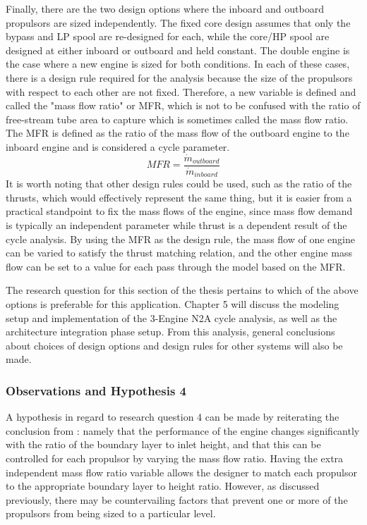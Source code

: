 			Finally, there are the two design options where the inboard and outboard propulsors are sized independently.  The fixed core design assumes that only the bypass and LP spool are re-designed for each, while the core/HP spool are designed at either inboard or outboard and held constant.  The double engine is the case where a new engine is sized for both conditions.  In each of these cases, there is a design rule required for the analysis because the size of the propulsors with respect to each other are not fixed.  Therefore, a new variable is defined and called the "mass flow ratio" or MFR, which is not to be confused with the ratio of free-stream tube area to capture which is sometimes called the mass flow ratio.  The MFR is defined as the ratio of the mass flow of the outboard engine to the inboard engine and is considered a cycle parameter.  
			\begin{equation}
				MFR = \frac{\dot{m}_{outboard}}{\dot{m}_{inboard}}
			\end{equation} 
			It is worth noting that other design rules could be used, such as the ratio of the thrusts, which would effectively represent the same thing, but it is easier from a practical standpoint to fix the mass flows of the engine, since mass flow demand is typically an independent parameter while thrust is a dependent result of the cycle analysis.  By using the MFR as the design rule, the mass flow of one engine can be varied to satisfy the thrust matching relation, and the other engine mass flow can be set to a value for each pass through the model based on the MFR.   			
			
			The research question for this section of the thesis pertains to which of the above options is preferable for this application.  Chapter 5 will discuss the modeling setup and implementation of the 3-Engine N2A cycle analysis, as well as the architecture integration phase setup.  From this analysis, general conclusions about choices of design options and design rules for other systems will also be made.  
									 			
  			\vspace{1pt}
  			\vspace{5mm}
									
			\subsubsection{Observations and Hypothesis 4} 
				A hypothesis in regard to research question 4 can be made by reiterating the conclusion from :  namely that the performance of the engine changes significantly with the ratio of the boundary layer to inlet height, and that this can be controlled for each propulsor by varying the mass flow ratio.  Having the extra independent mass flow ratio variable allows the designer to match each propulsor to the appropriate boundary layer to height ratio.  However, as discussed previously, there may be countervailing factors that prevent one or more of the propulsors from being sized to a particular level.  
				
